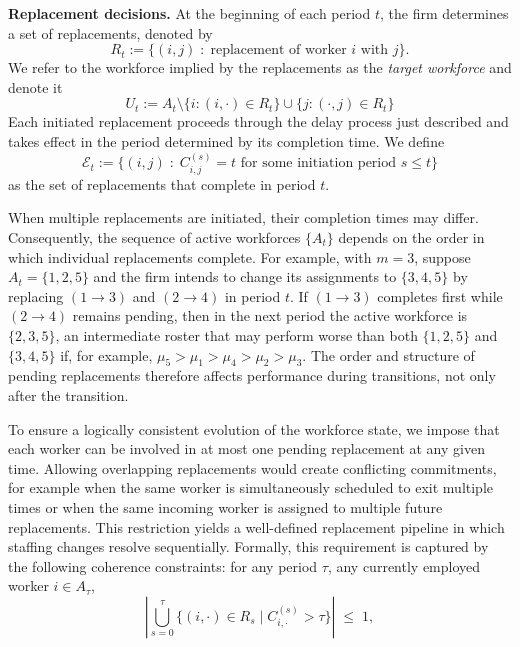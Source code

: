 \documentclass[opre,blindrev]{informs3}
\begin{document}
{\bf Replacement decisions.}
At the beginning of each period \(t\), the firm determines a set of replacements, denoted by 
\[
    R_t := \{(i,j) \;:\; \text{replacement of worker \(i\) with \(j\)}\}.
\]
We refer to the workforce implied by the replacements as the \emph{target workforce} and denote it
\[
    U_t:= A_t \setminus \{i: (i,\cdot) \in R_t\} \cup \{j: (\cdot, j) \in R_t\}
\]
Each initiated replacement proceeds through the delay process just described and takes effect in the period determined by its completion time. We define
\[
    \mathcal{E}_t := \{(i,j) \;:\; C_{i,j}^{(s)} = t \text{ for some initiation period } s \le t\}
\]
as the set of replacements that complete in period \(t\). 
\begin{remark}\label{ex:intermediate-set}
    When multiple replacements are initiated, their completion times may differ. Consequently, the sequence of active workforces \(\{A_t\}\) depends on the order in which individual replacements complete. For example, with \(m=3\), suppose \(A_t=\{1,2, 5\}\) and the firm intends to change its assignments to \(\{3,4, 5\}\) by replacing \((1\to 3)\) and \((2\to 4)\) in period \(t\). If \((1\to 3)\) completes first while \((2\to 4)\) remains pending, then in the next period the active workforce is \(\{2,3,5\}\), an intermediate roster that may perform worse than both \(\{1,2, 5\}\) and \(\{3,4, 5\}\) if, for example, \(\mu_5>\mu_1 > \mu_4 > \mu_2 > \mu_3\). The order and structure of pending replacements therefore affects performance during transitions, not only after the transition.
\end{remark}
To ensure a logically consistent evolution of the workforce state, we impose that each worker can be involved in at most one pending replacement at any given time. Allowing overlapping replacements would create conflicting commitments, for example when the same worker is simultaneously scheduled to exit multiple times or when the same incoming worker is assigned to multiple future replacements. This restriction yields a well-defined replacement pipeline in which staffing changes resolve sequentially. Formally, this requirement is captured by the following coherence constraints: for any period \(\tau\), any currently employed worker \(i \in A_\tau\),
\begin{equation}\label{eq:coherence-1}
    \left|\bigcup_{s=0}^{\tau}\{(i,\cdot)\in R_s \mid C_{i,\cdot}^{(s)}>\tau\}\right|\;\leq\; 1,
\end{equation}
\end{document}
